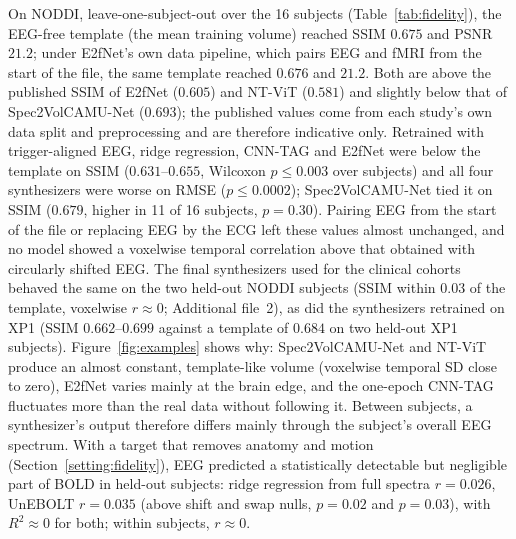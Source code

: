 \documentclass[pdflatex,referee,sn-basic]{sn-jnl}%
\begin{document}
On NODDI, leave-one-subject-out over the 16 subjects (Table~\ref{tab:fidelity}), the EEG-free template (the mean training volume) reached SSIM $0.675$ and PSNR $21.2$; under E2fNet's own data pipeline, which pairs EEG and fMRI from the start of the file, the same template reached $0.676$ and $21.2$. Both are above the published SSIM of E2fNet ($0.605$) and NT-ViT ($0.581$) and slightly below that of Spec2VolCAMU-Net ($0.693$); the published values come from each study's own data split and preprocessing and are therefore indicative only. Retrained with trigger-aligned EEG, ridge regression, CNN-TAG and E2fNet were below the template on SSIM ($0.631$--$0.655$, Wilcoxon $p\leq0.003$ over subjects) and all four synthesizers were worse on RMSE ($p\leq0.0002$); Spec2VolCAMU-Net tied it on SSIM ($0.679$, higher in 11 of 16 subjects, $p=0.30$). Pairing EEG from the start of the file or replacing EEG by the ECG left these values almost unchanged, and no model showed a voxelwise temporal correlation above that obtained with circularly shifted EEG. The final synthesizers used for the clinical cohorts behaved the same on the two held-out NODDI subjects (SSIM within $0.03$ of the template, voxelwise $r\approx0$; Additional file~2), as did the synthesizers retrained on XP1 (SSIM $0.662$--$0.699$ against a template of $0.684$ on two held-out XP1 subjects). Figure~\ref{fig:examples} shows why: Spec2VolCAMU-Net and NT-ViT produce an almost constant, template-like volume (voxelwise temporal SD close to zero), E2fNet varies mainly at the brain edge, and the one-epoch CNN-TAG fluctuates more than the real data without following it. Between subjects, a synthesizer's output therefore differs mainly through the subject's overall EEG spectrum. With a target that removes anatomy and motion (Section~\ref{setting:fidelity}), EEG predicted a statistically detectable but negligible part of BOLD in held-out subjects: ridge regression from full spectra $r=0.026$, UnEBOLT $r=0.035$ (above shift and swap nulls, $p=0.02$ and $p=0.03$), with $R^2\approx0$ for both; within subjects, $r\approx0$.
\end{document}
